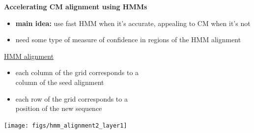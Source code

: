 \documentclass[landscape]{slides}
\begin{document}
\begin{slide}
\begin{center}

\textbf{Accelerating CM alignment using HMMs}
\end{center}
\medskip
\begin{minipage}{6in}
\footnotesize
\begin{itemize}
\item
\textbf{main idea:} use fast HMM when it's accurate, appealing to CM when it's not
\item
need some type of measure of confidence in regions of the HMM alignment

\end{itemize}
\small
\hspace{0.3in}
\underline{HMM alignment}%
\begin{itemize}
\item
each column of the grid corresponds to a \\ column
of the seed alignment
\item
each row of the grid corresponds to a \\ position of the new sequence
\end{itemize}
\vspace{3in}
\end{minipage}
\begin{minipage}{4in}
\begin{center}
\texttt{[image: figs/hmm\_alignment2\_layer1]}
\end{center}
\vspace{1.5in}
\end{minipage}
\end{slide}
\end{document}
